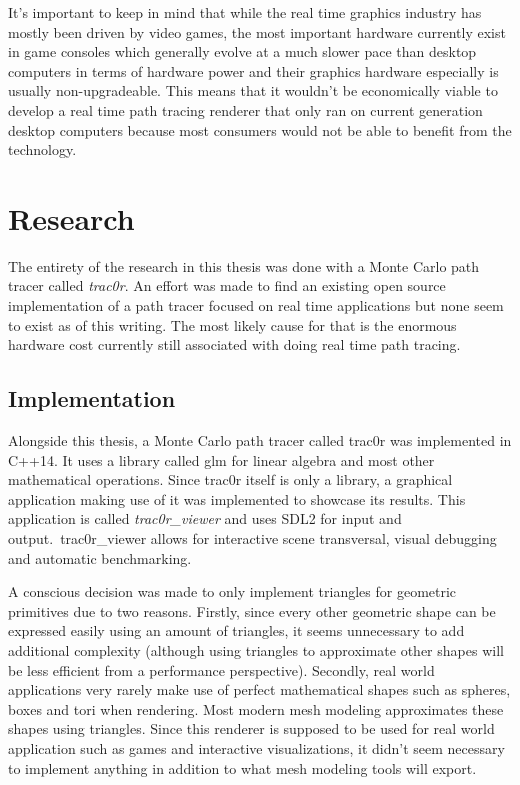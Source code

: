 \documentclass[
  twoside,
  11pt, a4paper,
  footinclude=true,
  headinclude=true,
  cleardoublepage=empty
]{scrreprt}
\begin{document}
It's important to keep in mind that while the real time graphics industry has mostly been driven by
video games, the most important hardware currently exist in game consoles which generally evolve at
a much slower pace than desktop computers in terms of hardware power and their graphics hardware
especially is usually non-upgradeable. This means that it wouldn't be economically viable to
develop a real time path tracing renderer that only ran on current generation desktop computers
because most consumers would not be able to benefit from the technology.

\chapter{Research}
The entirety of the research in this thesis was done with a Monte Carlo path tracer called
\emph{trac0r}.
An effort was made to find an existing open source implementation of a path tracer focused on
real time applications but none seem to exist as of this writing. The most likely cause for that is
the enormous hardware cost currently still associated with doing real time path tracing.

\section{Implementation}
Alongside this thesis, a Monte Carlo path tracer called trac0r was implemented in
C++14. It uses a library called glm \cite{site:glm} for linear algebra and most
other mathematical operations. Since trac0r itself is only a library, a graphical application making use
of it was implemented to showcase its results. This application is called \emph{trac0r\_viewer} and
uses SDL2 \cite{wiki:sdl} for input and output.\ trac0r\_viewer allows for interactive scene
transversal, visual debugging and automatic benchmarking.

A conscious decision was made to
only implement triangles for geometric primitives due to two reasons. Firstly, since every
other geometric shape can be expressed easily using an amount of triangles, it seems unnecessary to
add additional complexity (although using triangles to approximate other shapes will be less
efficient from a performance perspective). Secondly, real world applications very rarely make use of perfect
mathematical shapes such as spheres, boxes and tori when rendering. Most modern mesh modeling
approximates these shapes using triangles. Since this renderer is supposed to be used for real
world application such as games and interactive visualizations, it didn't seem necessary to
implement anything in addition to what mesh modeling tools will export. 
\end{document}
